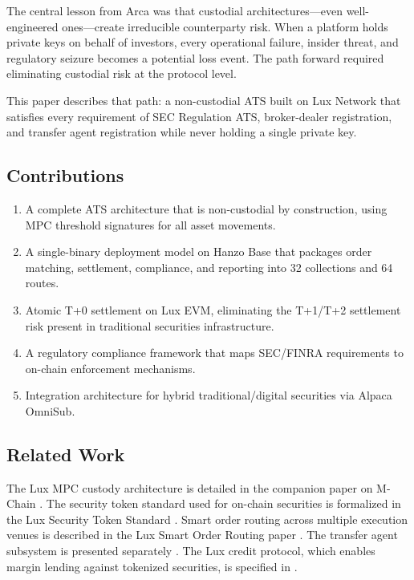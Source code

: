 The central lesson from Arca was that custodial architectures---even well-engineered ones---create irreducible counterparty risk. When a platform holds private keys on behalf of investors, every operational failure, insider threat, and regulatory seizure becomes a potential loss event. The path forward required eliminating custodial risk at the protocol level.

This paper describes that path: a non-custodial ATS built on Lux Network that satisfies every requirement of SEC Regulation ATS, broker-dealer registration, and transfer agent registration while never holding a single private key.

\subsection{Contributions}

\begin{enumerate}[nosep]
  \item A complete ATS architecture that is non-custodial by construction, using MPC threshold signatures for all asset movements.
  \item A single-binary deployment model on Hanzo Base that packages order matching, settlement, compliance, and reporting into 32 collections and 64 routes.
  \item Atomic T+0 settlement on Lux EVM, eliminating the T+1/T+2 settlement risk present in traditional securities infrastructure.
  \item A regulatory compliance framework that maps SEC/FINRA requirements to on-chain enforcement mechanisms.
  \item Integration architecture for hybrid traditional/digital securities via Alpaca OmniSub.
\end{enumerate}

\subsection{Related Work}

The Lux MPC custody architecture is detailed in the companion paper on M-Chain \cite{lux-mchain-mpc}. The security token standard used for on-chain securities is formalized in the Lux Security Token Standard \cite{lux-security-token-standard}. Smart order routing across multiple execution venues is described in the Lux Smart Order Routing paper \cite{lux-smart-order-routing}. The transfer agent subsystem is presented separately \cite{lux-transfer-agent}. The Lux credit protocol, which enables margin lending against tokenized securities, is specified in \cite{lux-credit-protocol-spec}.

